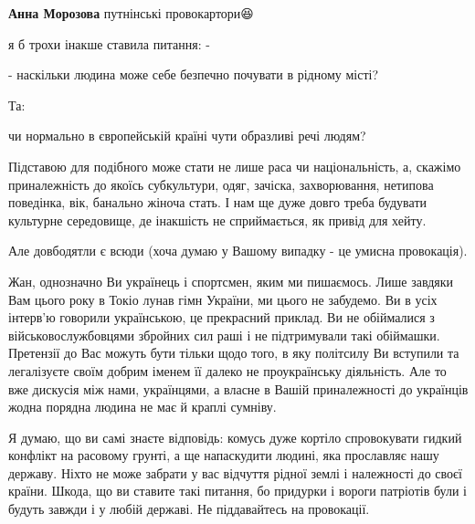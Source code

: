 \begin{itemize}
\begin{itemize}
\textbf{Анна Морозова} путнінські провокартори😆
\end{itemize}

 

я б трохи інакше ставила питання: -

- наскільки людина може себе безпечно почувати в рідному місті?

Та:

чи нормально в європейській країні чути образливі речі людям?

Підставою для подібного може стати не лише раса чи національність, а, скажімо приналежність до якоїсь субкультури, одяг, зачіска, захворювання, нетипова поведінка, вік, банально жіноча стать. І нам ще дуже довго треба будувати культурне середовище, де інакшість не сприймається, як привід для хейту.

Але довбодятли є всюди (хоча думаю у Вашому випадку - це умисна провокація).

 

Жан, однозначно Ви українець і спортсмен, яким ми пишаємось. Лише завдяки Вам
цього року в Токіо лунав гімн України, ми цього не забудемо. Ви в усіх інтерв'ю
говорили українською, це прекрасний приклад. Ви не обіймалися з
військовослужбовцями збройних сил раші і не підтримували такі обіймашки.
Претензії до Вас можуть бути тільки щодо того, в яку політсилу Ви вступили та
легалізуєте своїм добрим іменем її далеко не проукраїнську діяльність. Але то
вже дискусія між нами, українцями, а власне в Вашій приналежності до українців
жодна порядна людина не має й краплі сумніву.

 

Я думаю, що ви самі знаєте відповідь: комусь дуже кортіло спровокувати гидкий
конфлікт на расовому грунті, а ще напаскудити людині, яка прославляє нашу
державу. Ніхто не може забрати у вас відчуття рідної землі і належності до
своєї країни. Шкода, що ви ставите такі питання, бо придурки і вороги патріотів
були і будуть завжди і у любій державі. Не піддавайтесь на провокації.


\end{itemize}
